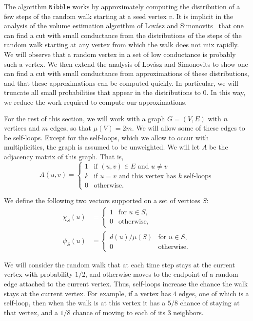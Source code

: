 \documentclass[11pt]{article}
\def\vol#1{\mu \left(#1  \right)}
\begin{document}
The algorithm
  \texttt{Nibble}
  works by approximately computing the distribution
  of a few steps of the random walk starting at a
  seed vertex $v$.
It is implicit in the analysis of the volume
  estimation algorithm of Lov\'asz and
  Simonovits~\cite{LovaszSimonovits}
  that one can find a cut with small conductance from the distributions
  of the steps of the
  random walk starting at any vertex from which
  the walk does not mix rapidly.
We will observe that a random vertex in a set of low conductance
  is probably such a vertex.
We then extend the analysis of Lov\'asz and Simonovits
  to show one can find a cut with small conductance from approximations
  of these distributions, and that
  these approximations can be computed quickly.
In particular, we will truncate all
  small probabilities that appear in the distributions to 0.
In this way, we reduce the work required to
  compute our approximations.

For the rest of this section, we will work with a graph
  $G = (V,E)$ with $n$ vertices and $m$ edges, so that
  $\vol{V} = 2m$.
We will allow some of these edges to be self-loops.
Except for the self-loops, which we allow to occur with multiplicities,
  the graph is assumed to be unweighted.
We will let $A$ be the adjacency matrix of this graph.
That is,
\[
A (u,v) =
\begin{cases}
1 & \text{if $(u,v) \in E$ and $u \not = v$}
\\
k & \text{if $u = v$ and this vertex has $k$ self-loops}\\
0 & \text{otherwise}.
\end{cases}
\]

We define the following two vectors supported on a set of vertices $S$:
\begin{align*}
  \chi _{S} (u)
& =
  \begin{cases}
     1 & \text{for $u \in S$,}\\
     0 & \text{otherwise},
  \end{cases}\\
  \psi _{S} (u)
& =
  \begin{cases}
     d (u) / \vol{S} & \text{for $u \in S$,}\\
     0 & \text{otherwise}.
  \end{cases}
\end{align*}

We will consider the random walk
  that at each time step stays at the current vertex with probability $1/2$,
  and otherwise moves to the endpoint of a random edge attached
  to the current vertex.
Thus, self-loops increase the chance the walk stays at the current vertex.
For example, if a vertex has $4$ edges, one of which is a self-loop,
  then when the walk is at this vertex it has a $5/8$ chance of staying
  at that vertex, and a $1/8$ chance of moving to each of its $3$ neighbors.
\end{document}
